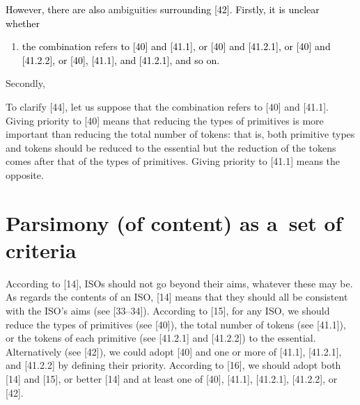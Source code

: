 \textcolor{black}{However, there are also }ambiguities\textcolor{black}{ surrounding [42]. Firstly, it is unclear whether }



\begin{enumerate}

\item \textcolor{black}{the combination }refers\textcolor{black}{ to [40] and [41.1], or }\textcolor{black}{[40] and }\textcolor{black}{[41.2.1]}\textcolor{black}{, or [40] and [41.2.2], or [40], [41.1], and [41.2.1], and so on. }

\end{enumerate}

Secondly,



\setcounter{saveenum}{\value{enumi}}

\begin{enumerate}

\setcounter{enumi}{\value{saveenum}}

\item {\color{black}

once [43] is clarified, we should also define the order of priority of the combination.

\end{enumerate}

To clarify [44], let us suppose that the combination refers to [40] and [41.1]. Giving priority to [40] means that reducing the types of primitives is more important than reducing the total number of tokens: that is, both primitive types and tokens should be reduced to the essential but the reduction of the tokens comes after that of the types of primitives. Giving priority to [41.1] means the opposite.



\section{Parsimony (of content) as a~set of criteria}

According to [14], ISOs should not go beyond their aims, whatever these may be. As regards the contents of an ISO, [14] means that they should all be consistent with the ISO's aims (see [33–34]). According to [15], for any ISO, we should reduce the types of primitives (see [40]), the total number of tokens (see [41.1]), or the tokens of each primitive (see [41.2.1] and [41.2.2]) to the essential. Alternatively (see [42]), we could adopt [40] and one or more of [41.1], [41.2.1], and [41.2.2] by defining their priority. According to [16], we should adopt both [14] and [15], or better [14] and at least one of [40], [41.1], [41.2.1], [41.2.2], or [42].



